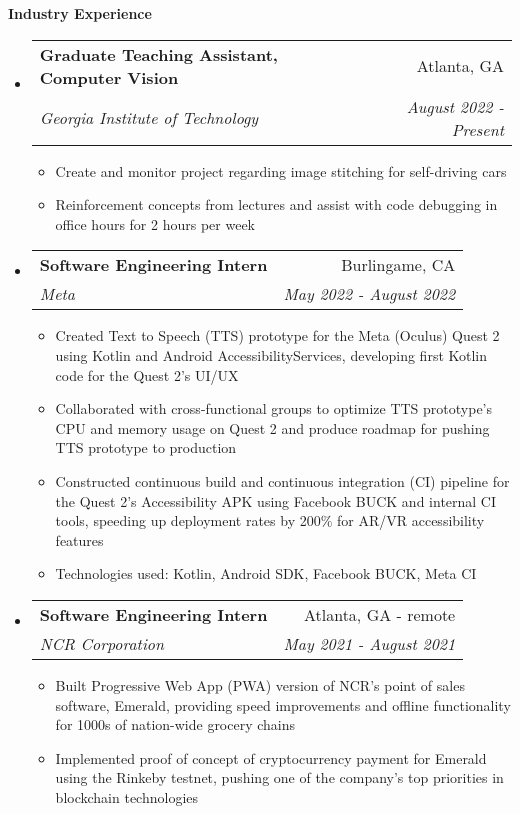 \documentclass[letterpaper,10pt]{article}
\makeatletter
\newcommand{\resitem}[1]{\item #1 \vspace{-3.5pt}}  %
\newcommand{\resheading}[1]{{\large \colorbox{mygrey}{\begin{minipage}{0.989\textwidth}{\textbf{#1 \vphantom{p\^{E}}}}\end{minipage}}}}
\newcommand{\ressubheading}[4]{
\begin{tabular*}{7.0in}{l@{\extracolsep{\fill}}r}  
		\textbf{#1} & #2 \\
		\textit{#3} & \textit{#4} \\
\end{tabular*}\vspace{-6pt}}  %
\makeatother
\begin{document}

\resheading{Industry Experience}

\begin{itemize}
\item
    \ressubheading{Graduate Teaching Assistant, Computer Vision}{Atlanta, GA}{Georgia Institute of Technology}{August 2022 - Present}
    \begin{itemize}
        \resitem{Create and monitor project regarding image stitching for self-driving cars}
        \resitem{Reinforcement concepts from lectures and assist with code debugging in office hours for 2 hours per week}
    \end{itemize}
\item
    \ressubheading{Software Engineering Intern}{Burlingame, CA}{Meta}{May 2022 - August 2022}
    \begin{itemize}
        \resitem{Created Text to Speech (TTS) prototype for the Meta (Oculus) Quest 2 using Kotlin and Android AccessibilityServices, developing first Kotlin code for the Quest 2's UI/UX}
        \resitem{Collaborated with cross-functional groups to optimize TTS prototype's CPU and memory usage on Quest 2 and produce roadmap for pushing TTS prototype to production}
        \resitem{Constructed continuous build and continuous integration (CI) pipeline for the Quest 2's Accessibility APK using Facebook BUCK and internal CI tools, speeding up deployment rates by 200\% for AR/VR accessibility features}
        \resitem{Technologies used: Kotlin, Android SDK, Facebook BUCK, Meta CI}
    \end{itemize}
\item
    \ressubheading{Software Engineering Intern}{Atlanta, GA - remote}{NCR Corporation}{May 2021 - August 2021}
    \begin{itemize}
        \resitem{Built Progressive Web App (PWA) version of NCR's point of sales software, Emerald, providing speed improvements and offline functionality for 1000s of nation-wide grocery chains}
        \resitem{Implemented proof of concept of cryptocurrency payment for Emerald using the Rinkeby testnet, pushing one of the company's top priorities in blockchain technologies}

\end{itemize}
\end{itemize}
\end{document}
